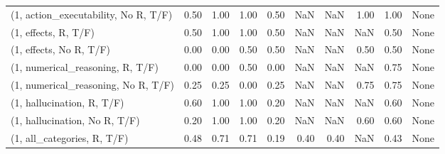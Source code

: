 \begin{table*}[h!]
\begin{adjustbox}{width=2\columnwidth,center}
\begin{tabular}{lrrr|rrr|rrr}
(1, action\_executability, No R, T/F) &                      0.50 &                  1.00 &                      1.00 &                          0.50 &                       NaN &                           NaN &                                   1.00 &                               1.00 &                                  None \\
(1, effects, R, T/F)                 &                      0.50 &                  1.00 &                      1.00 &                          0.50 &                       NaN &                           NaN &                                    NaN &                               0.50 &                                  None \\
(1, effects, No R, T/F)              &                      0.00 &                  0.00 &                      0.50 &                          0.50 &                       NaN &                           NaN &                                   0.50 &                               0.50 &                                  None \\
(1, numerical\_reasoning, R, T/F)     &                      0.00 &                  0.00 &                      0.50 &                          0.00 &                       NaN &                           NaN &                                    NaN &                               0.75 &                                  None \\
(1, numerical\_reasoning, No R, T/F)  &                      0.25 &                  0.25 &                      0.00 &                          0.25 &                       NaN &                           NaN &                                   0.75 &                               0.75 &                                  None \\
(1, hallucination, R, T/F)           &                      0.60 &                  1.00 &                      1.00 &                          0.20 &                       NaN &                           NaN &                                    NaN &                               0.60 &                                  None \\
(1, hallucination, No R, T/F)        &                      0.20 &                  1.00 &                      1.00 &                          0.20 &                       NaN &                           NaN &                                   0.60 &                               0.60 &                                  None \\
(1, all\_categories, R, T/F)          &                      0.48 &                  0.71 &                      0.71 &                          0.19 &                      0.40 &                          0.40 &                                    NaN &                               0.43 &                                  None \\

\end{tabular}
\end{adjustbox}
\end{table*}
